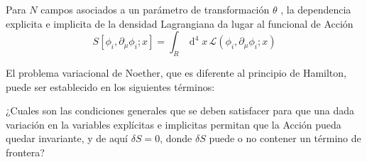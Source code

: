 \begin{frame}
Para $N$ campos asociados a un parámetro de transformación $\theta$ , la dependencia explicita e implicita de la densidad Lagrangiana da lugar al funcional de Acción
\begin{equation}
  S[\phi_i,\partial_\mu\phi_i;x]=\int_{R}\operatorname{d}^4x\,\mathcal{L}(\phi_i,\partial_\mu\phi_i;x)
\end{equation}


El problema variacional de Noether, que es diferente al principio de Hamilton, puede ser establecido en los siguientes términos:


\noindent
¿Cuales son las condiciones generales que se deben satisfacer para que una dada variación en la variables explícitas e implicitas permitan que la Acción pueda quedar invariante, y de aquí $\delta S=0$, donde $\delta S$ puede o no contener un término de frontera?


\end{frame}
